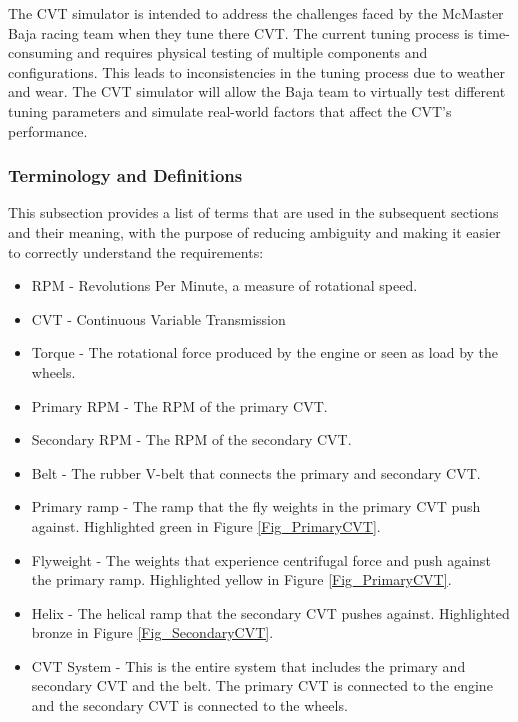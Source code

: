 \documentclass[12pt]{article}
\begin{document}
The CVT simulator is intended to address the challenges faced by the McMaster Baja racing team when they tune there CVT.
The current tuning process is time-consuming and requires physical testing of multiple components and configurations. This leads to inconsistencies in the tuning process due to weather and wear.
The CVT simulator will allow the Baja team to virtually test different tuning parameters and simulate real-world factors that affect the CVT's performance.

\subsubsection{Terminology and  Definitions}


This subsection provides a list of terms that are used in the subsequent
sections and their meaning, with the purpose of reducing ambiguity and making it
easier to correctly understand the requirements:

\begin{itemize}
  \item RPM - Revolutions Per Minute, a measure of rotational speed.
  \item CVT - Continuous Variable Transmission
  \item Torque - The rotational force produced by the engine or seen as load by the wheels. 
  \item Primary RPM - The RPM of the primary CVT.
  \item Secondary RPM - The RPM of the secondary CVT.
  \item Belt - The rubber V-belt that connects the primary and secondary CVT.
  \item Primary ramp - The ramp that the fly weights in the primary CVT push against. Highlighted green in Figure \ref{Fig_PrimaryCVT}.
  \item Flyweight - The weights that experience centrifugal force and push against the primary ramp. Highlighted yellow in Figure \ref{Fig_PrimaryCVT}.
  \item Helix - The helical ramp that the secondary CVT pushes against. Highlighted bronze in Figure \ref{Fig_SecondaryCVT}.
  \item CVT System - This is the entire system that includes the primary and secondary CVT and the belt. The primary CVT is connected to the engine and the secondary CVT is connected to the wheels.
\end{itemize}
\end{document}
